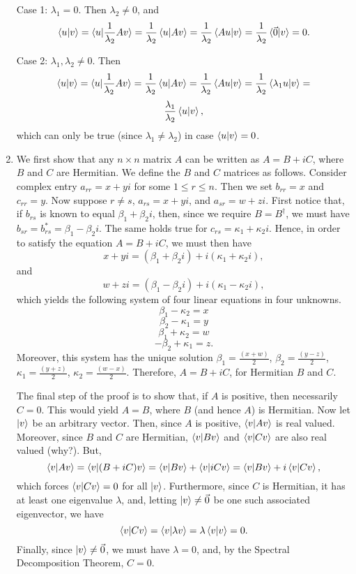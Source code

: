 \documentclass [12pt]{article}
\theoremstyle{definition}
\begin{document}
\begin{enumerate}
Case 1: $\lambda_1 = 0$. Then $\lambda_2\not=0$, and
\[\braket{u|v} = \braket{u|\frac{1}{\lambda_2}Av} = \frac{1}{\lambda_2}\braket{u|Av} = \frac{1}{\lambda_2}\braket{Au|v}= \frac{1}{\lambda_2}\braket{\vec{0}|v} = 0.\]

Case 2: $\lambda_1,\lambda_2 \not= 0$. Then
\[\braket{u|v} = \braket{u|\frac{1}{\lambda_2}Av} = \frac{1}{\lambda_2}\braket{u|Av} = \frac{1}{\lambda_2}\braket{Au|v}= \frac{1}{\lambda_2}\braket{\lambda_1 u|v} =\]
\[\frac{\lambda_1}{\lambda_2}\braket{u|v},\]
which can only be true (since $\lambda_1\not=\lambda_2$) in case $\braket{u|v}=0$.

\item We first show that any $n\times n$ matrix $A$ can be written as $A=B+iC$, where $B$ and $C$ are Hermitian. We define the $B$ and $C$ matrices as follows.
Consider complex entry $a_{rr}=x+yi$ for some $1\leq r\leq n$. Then
we set $b_{rr}=x$ and $c_{rr} = y$. Now suppose $r\not= s$, $a_{rs}=x+yi$, and $a_{sr}=w+zi$. First notice that, if $b_{rs}$ is known to equal $\beta_1 + \beta_2 i$, then, since we 
require $B=B^{\dagger}$, we must have $b_{sr}=b_{rs}^*=\beta_1 - \beta_2 i$. The same holds true for $c_{rs}=\kappa_1+\kappa_2 i$. Hence, in order to satisfy the equation 
$A=B+iC$, we must then have 
\[x + yi = (\beta_1 + \beta_2 i) + i(\kappa_1+\kappa_2 i),\]
and
\[w + zi = (\beta_1 - \beta_2 i) + i(\kappa_1-\kappa_2 i),\]
which yields the following system of four linear equations in four unknowns.
\[\beta_1 - \kappa_2 = x\]
\[\beta_2 - \kappa_1 = y\]
\[\beta_1 + \kappa_2 = w\]
\[-\beta_2 + \kappa_1 = z.\]
Moreover, this system has the unique solution $\beta_1 = \frac{(x+w)}{2}$, $\beta_2 = \frac{(y-z)}{2}$, $\kappa_1 = \frac{(y+z)}{2}$, $\kappa_2 = \frac{(w-x)}{2}$.
Therefore, $A=B+iC$, for Hermitian $B$ and $C$. 

The final step of the proof is to show that, if $A$ is positive, then necessarily $C=0$. This would yield $A=B$, where $B$ (and hence $A$) is Hermitian. Now let 
$\ket{v}$ be an arbitrary vector. Then, since $A$ is positive, $\braket{v|Av}$ is real valued. Moreover, since $B$ and $C$ are Hermitian, 
$\braket{v|Bv}$ and $\braket{v|Cv}$ are also real valued (why?). But, 
\[\braket{v|Av} = \braket{v|(B+iC)v} = \braket{v|Bv} + \braket{v|iCv} = \braket{v|Bv} + i\braket{v|Cv},\]
which forces $\braket{v|Cv}=0$ for all $\ket{v}$. Furthermore, since $C$ is Hermitian, it has at least one eigenvalue $\lambda$, and, letting $\ket{v}\not=\vec{0}$ be one such associated eigenvector,
we have 
\[\braket{v|Cv}= \braket{v|\lambda v}=\lambda \braket{v|v} = 0.\]
Finally, since $\ket{v}\not=\vec{0}$, we must have $\lambda = 0$, and, by the Spectral Decomposition Theorem, $C=0$. 









\end{enumerate}
\end{document}
